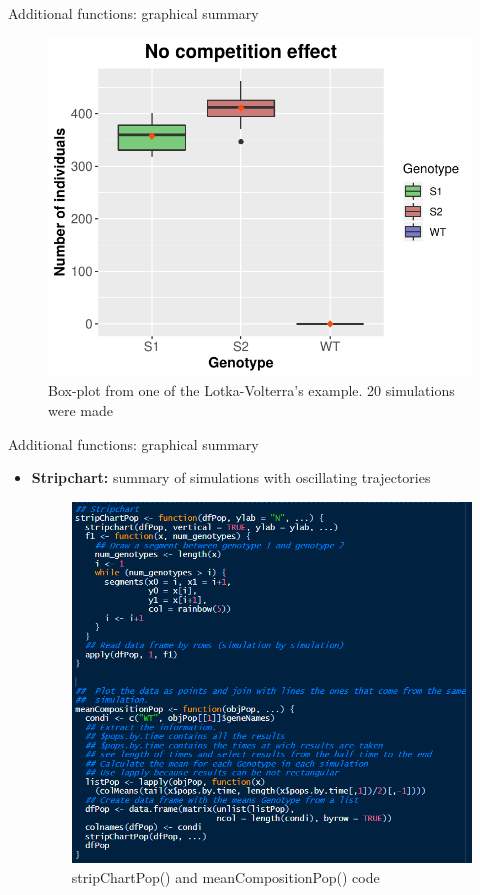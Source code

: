 \begin{frame}{Additional functions: graphical summary}
    \begin{figure}
    \centering
    \includegraphics[scale=0.65]{img/boxplot_example.pdf}
    \caption{Box-plot from one of the Lotka-Volterra's example. 20 simulations were made}
    \end{figure}
\end{frame}

\begin{frame}{Additional functions: graphical summary}
    \begin{itemize}
    \item \textbf{Stripchart:} summary of simulations with oscillating trajectories
        \begin{figure}
        \centering
        \includegraphics[scale=0.4]{img/stripchart_code.PNG}
        \caption{stripChartPop() and meanCompositionPop() code}
        \end{figure}
     \end{itemize}
\end{frame}

